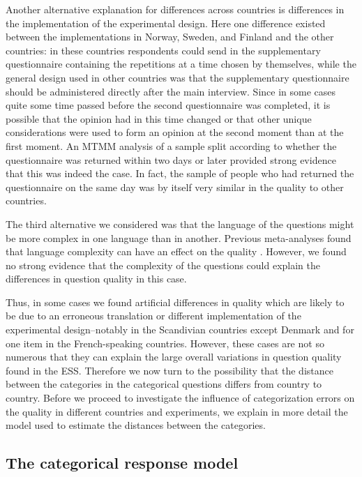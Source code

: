 \documentclass[a4paper,12pt]{article}
\begin{document}
Another alternative explanation for differences across countries is differences in the implementation of the experimental design. Here one difference existed between the implementations in Norway, Sweden, and Finland and the other countries: in these countries respondents could send in the supplementary questionnaire containing the repetitions at a time chosen by themselves, while the general design used in other countries was that the supplementary questionnaire should be administered directly after the main interview. Since in some cases quite some time passed before the second questionnaire was completed, it is possible that the opinion had in this time changed or that other unique considerations were used to form an opinion at the second moment than at the first moment. An MTMM analysis of a sample split according to whether the questionnaire was returned within two days or later provided strong evidence that this was indeed the case. In fact, the sample of people who had returned the questionnaire on the same day was by itself very similar in the quality to other countries. 

The third alternative we considered was that the language of the questions might be more complex in one language than in another. Previous meta-analyses found that language complexity can have an effect on the quality \citep{saris_estimation_2007}. However, we found no strong evidence that the complexity of the questions could explain the differences in question quality in this case.

Thus, in some cases we found artificial differences in quality which are likely to be due to an erroneous translation or different implementation of the experimental design--notably in the Scandivian countries except Denmark and for one item in the French-speaking countries. However, these cases are not so numerous that they can explain the large overall variations in question quality found in the ESS. Therefore we now turn to the possibility that the distance between the categories in the categorical questions differs from country to country. Before we proceed to investigate the influence of categorization errors on the quality in different countries and experiments, we explain in more detail the model used to estimate the distances between the categories.


\subsection{The categorical response model}
\end{document}
